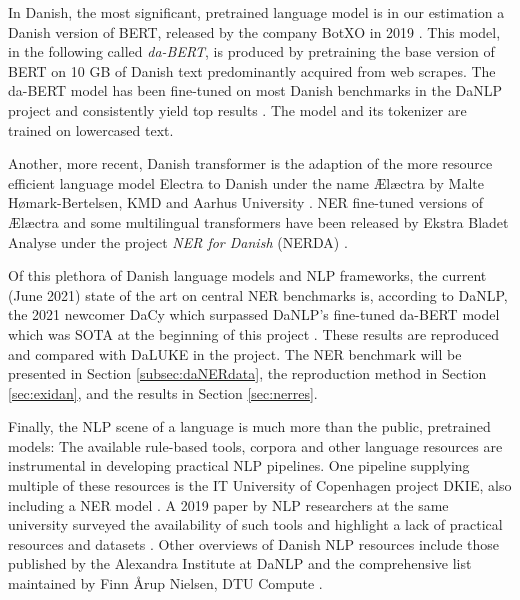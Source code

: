 \documentclass[main.tex]{subfiles}
\begin{document}
In Danish, the most significant, pretrained language model is in our estimation a Danish version of BERT, released by the company BotXO in 2019 \cite{botxo2019dabert} .
This model, in the following called \emph{da-BERT}, is produced by pretraining the base version of BERT \cite{devlin2019bert} on 10 GB of Danish text predominantly acquired from web scrapes.
The da-BERT model has been fine-tuned on most Danish benchmarks in the DaNLP project and consistently yield top results \cite{danlp2021, hvingelby2020dane}.
The model and its tokenizer are trained on lowercased text.

Another, more recent, Danish transformer is the adaption of the more resource efficient language model Electra to Danish under the name Ælæctra by Malte Hømark-Bertelsen, KMD and Aarhus University \cite{bertelsen2020lctra}.
NER fine-tuned versions of Ælæctra and some multilingual transformers have been released by Ekstra Bladet Analyse under the project \emph{NER for Danish} (NERDA) \cite{kjeldgaard2020nerda}.

Of this plethora of Danish language models and NLP frameworks, the current (June 2021) state of the art on central NER benchmarks is, according to DaNLP, the 2021 newcomer DaCy which surpassed DaNLP's fine-tuned da-BERT model which was SOTA at the beginning of this project \footnotemark.
These results are reproduced and compared with DaLUKE in the project.
The NER benchmark will be presented in Section \ref{subsec:daNERdata}, the reproduction method in Section \ref{sec:exidan}, and the results in Section \ref{sec:nerres}.

Finally, the NLP scene of a language is much more than the public, pretrained models:
The available rule-based tools, corpora and other language resources are instrumental in developing practical NLP pipelines.
One pipeline supplying multiple of these resources is the IT University of Copenhagen project DKIE, also including a NER model \cite{derc2014dkie}.
A 2019 paper by NLP researchers at the same university surveyed the availability of such tools and highlight a lack of practical resources and datasets \cite{kirkedal2019lacunae}.
Other overviews of Danish NLP resources include those published by the Alexandra Institute at DaNLP \cite{danlp2021} and the comprehensive list maintained by Finn Årup Nielsen, DTU Compute \cite{arup21awesome}.
\end{document}
